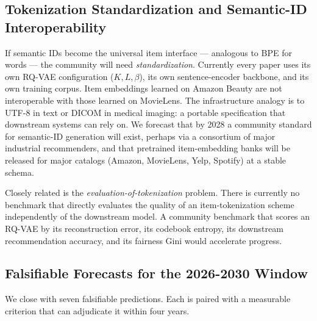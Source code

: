 \documentclass{article}
\begin{document}
\subsection{Tokenization Standardization and Semantic-ID Interoperability}\label{tokenization-standardization-and-semantic-id-interoperability}

If semantic IDs become the universal item interface --- analogous to BPE for words --- the community will need \emph{standardization}. Currently every paper uses its own RQ-VAE configuration (\(K, L, \beta\)), its own sentence-encoder backbone, and its own training corpus. Item embeddings learned on Amazon Beauty are not interoperable with those learned on MovieLens. The infrastructure analogy is to UTF-8 in text or DICOM in medical imaging: a portable specification that downstream systems can rely on. We forecast that by 2028 a community standard for semantic-ID generation will exist, perhaps via a consortium of major industrial recommenders, and that pretrained item-embedding banks will be released for major catalogs (Amazon, MovieLens, Yelp, Spotify) at a stable schema.

Closely related is the \emph{evaluation-of-tokenization} problem. There is currently no benchmark that directly evaluates the quality of an item-tokenization scheme independently of the downstream model. A community benchmark that scores an RQ-VAE by its reconstruction error, its codebook entropy, its downstream recommendation accuracy, and its fairness Gini would accelerate progress.

\subsection{Falsifiable Forecasts for the 2026-2030 Window}\label{falsifiable-forecasts-for-the-2026-2030-window}

We close with seven falsifiable predictions. Each is paired with a measurable criterion that can adjudicate it within four years.
\end{document}
